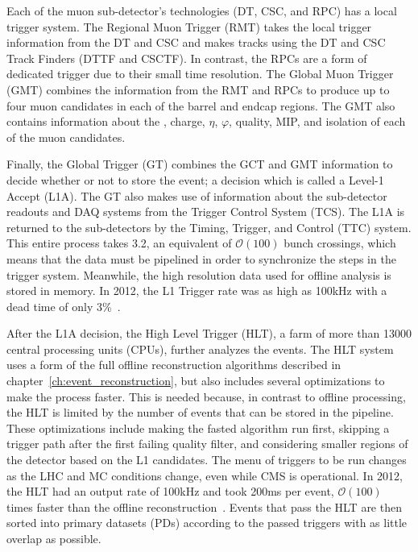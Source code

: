 Each of the muon sub-detector's technologies (DT, CSC, and RPC) has a local trigger system.
The Regional Muon Trigger (RMT) takes the local trigger information from the DT and CSC and makes tracks using the DT and CSC Track Finders (DTTF and CSCTF).
In contrast, the RPCs are a form of dedicated trigger due to their small time resolution.
The Global Muon Trigger (GMT) combines the information from the RMT and RPCs to produce up to four muon candidates in each of the barrel and endcap regions.
The GMT also contains information about the \pt, charge, $\eta$, $\varphi$, quality, MIP, and isolation of each of the muon candidates.

Finally, the Global Trigger (GT) combines the GCT and GMT information to decide whether or not to store the event; a decision which is called a Level-1 Accept (L1A).
The GT also makes use of information about the sub-detector readouts and DAQ systems from the Trigger Control System (TCS). The L1A is returned to the sub-detectors by the Timing, Trigger, and Control (TTC) system.
This entire process takes 3.2\mus, an equivalent of $\mathcal{O}(100)$ bunch crossings, which means that the data must be pipelined in order to synchronize the steps in the trigger system.
Meanwhile, the high resolution data used for offline analysis is stored in memory. In 2012, the L1 Trigger rate was as high as 100\unit{kHz} with a dead time of only 3\%~\cite{Brooke:2013hnf}.

After the L1A decision, the High Level Trigger (HLT), a farm of more than 13000 central processing units (CPUs), further analyzes the events. The HLT 
system uses a form of the full offline reconstruction algorithms described in chapter~\ref{ch:event_reconstruction}, but also includes several optimizations to make the process faster. This is needed because, in contrast to offline processing, the HLT is limited by the number of events that can be stored in the pipeline. These optimizations include making the fasted algorithm run first, skipping a trigger path after the first failing quality filter, and considering smaller regions of the detector based on the L1 candidates. The menu of triggers to be run changes as the LHC and MC conditions change, even while CMS is operational. In 2012, the HLT had an output rate of 100\unit{kHz} and took 200\unit{ms} per event, $\mathcal{O}(100)$ times faster than the offline reconstruction~\cite{Trocino:2014jya}. Events that pass the HLT are then sorted into primary datasets (PDs) according to the passed triggers with as little overlap as possible.

